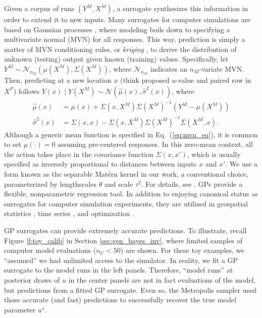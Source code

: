 \documentclass[11pt]{article}
\begin{document}
Given a corpus of runs $(Y^M, X^M)$, a surrogate synthesizes this information
in order to extend it to new inputs.  Many surrogates for computer
simulations are based on Gaussian processes
\citep[e.g.,][]{rasmussen2003gaussian}, where modeling boils down to
specifying a multivariate normal (MVN) for all responses.  This way,
prediction is simply a matter of MVN conditioning rules, or {\em kriging}
\citep{matheron1963principles}, to derive the distribution of unknown
(testing) output given known (training) values. Specifically, let $Y^M
\sim \mathcal{N}_{n_M}(\mu(X^M), \Sigma(X^M))$, where $\mathcal{N}_{n_M}$
indicates an $n_M$-variate MVN. Then, predicting at a new location $x$ (think
proposed $u$-value and paired row in $X^F$) follows $Y(x) \mid Y(X^M) \sim
\mathcal{N}(\hat{\mu}(x), \hat{\sigma}^2(x))$, where
\begin{align}
\hat{\mu}(x) &= \mu(x) + \Sigma(x, X^M) \Sigma(X^M)^{-1} (Y^M - \mu(X^M)) \label{eq:mvn_eq}\\
\hat{\sigma}^2(x) &= \Sigma(x, x) - \Sigma(x, X^M) \Sigma(X^M)^{-1} \Sigma(X^M, x). \nonumber
\end{align}
Although a generic mean function is specified in Eq.~(\ref{eq:mvn_eq}), it is
common to set $\mu(\cdot)=0$ assuming pre-centered responses. In this zero-mean
context, all the action takes place in the covariance function $\Sigma(x, x')$,
which is usually specified as inversely proportional to distances between inputs
$x$ and $x'$. We use a form known as the separable Mat\'ern kernel
\citep{stein1999interpolation} in our work, a conventional choice, parameterized
by lengthscales $\theta$ and scale $\tau^2$. For details, see \citet[][Chapter
5]{gramacy2020surrogates}. GPs provide a flexible, nonparametric regression
tool. In addition to enjoying canonical status as surrogates for computer
simulation experiments, they are utilized in geospatial statistics
\citep{cressie2011statistics}, time series \citep{roberts2013gaussian}, and
optimization \citep{jones1998efficient}.

GP surrogates {\color{red}can provide extremely accurate predictions}. To
illustrate, recall Figure \ref{f:toy_calib} in
Section \ref{sec:gen_bayes_inv}, where limited samples of computer model
evaluations {\color{red}($n_U < 50$)} are shown. For these toy examples, we
``assumed'' we had unlimited access to the simulator. In reality, we fit a GP
surrogate to the model runs in the left panels. Therefore, ``model runs'' at
posterior draws of $u$ in the center panels are not in fact evaluations of the
model, but predictions from a fitted GP surrogate. Even so, the Metropolis
sampler used those accurate (and fast) predictions to successfully recover the
true model parameter $u^\star$.
\end{document}
